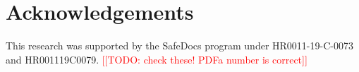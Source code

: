 \documentclass[conference,10pt]{IEEEtran}
\newcommand{\note}[1]{\noteYes{#1}}
\newcommand{\noteYes}[1]{\textcolor{red}{[[#1]]}}
\newcommand{\todo}[1]{\note{TODO: #1}}
\begin{document}


\section*{Acknowledgements}

This research was supported by the SafeDocs program under HR0011-19-C-0073 and HR001119C0079.
\todo{check these! PDFa number is correct}




\end{document}
